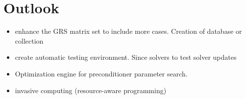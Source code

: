 \section{Outlook}
\label{subseq:part-2-outlook}

\begin{itemize}

	\item enhance the GRS matrix set to include more cases. Creation of database or collection
	
	\item create automatic testing environment. Since solvers to test solver updates

	\item Optimization engine for preconditioner parameter search.

	
	\item invasive computing (resource-aware programming)
		
	
\end{itemize}